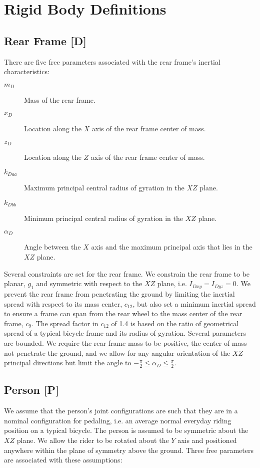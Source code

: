 \documentclass{bmd2019a}
\begin{document}
\section*{Rigid Body Definitions}

\subsection*{Rear Frame [D]}
%
There are five free parameters associated with the rear frame's inertial
characteristics:

\begin{description}
  \item[$m_D$] Mass of the rear frame.
  \item[$x_D$] Location along the $X$ axis of the rear frame center of mass.
  \item[$z_D$] Location along the $Z$ axis of the rear frame center of mass.
  \item[$k_{Daa}$] Maximum principal central radius of gyration in the $XZ$
    plane.
  \item[$k_{Dbb}$] Minimum principal central radius of gyration in the $XZ$
    plane.
  \item[$\alpha_D$] Angle between the $X$ axis and the maximum principal axis
    that lies in the $XZ$ plane.
\end{description}

Several constraints are set for the rear frame. We constrain the rear frame to
be planar, $g_1$ and symmetric with respect to the $XZ$ plane, i.e. $I_{Dxy} =
I_{Dyz} = 0$. We prevent the rear frame from penetrating the ground by limiting
the inertial spread with respect to its mass center, $c_{12}$, but also set a
minimum inertial spread to ensure a frame can span from the rear wheel to the
mass center of the rear frame, $c_9$. The spread factor in $c_{12}$ of 1.4 is
based on the ratio of geometrical spread of a typical bicycle frame and its
radius of gyration. Several parameters are bounded. We require the rear frame
mass to be positive, the center of mass not penetrate the ground, and we allow
for any angular orientation of the $XZ$ principal directions but limit the
angle to $-\frac{\pi}{2} \leq \alpha_D \leq \frac{\pi}{2}$.

\subsection{Person [P]}

We assume that the person's joint configurations are such that they are in a
nominal configuration for pedaling, i.e. an average normal everyday riding
position on a typical bicycle. The person is assumed to be symmetric about the
$XZ$ plane. We allow the rider to be rotated about the $Y$ axis and positioned
anywhere within the plane of symmetry above the ground. Three free parameters
are associated with these assumptions:
\end{document}
